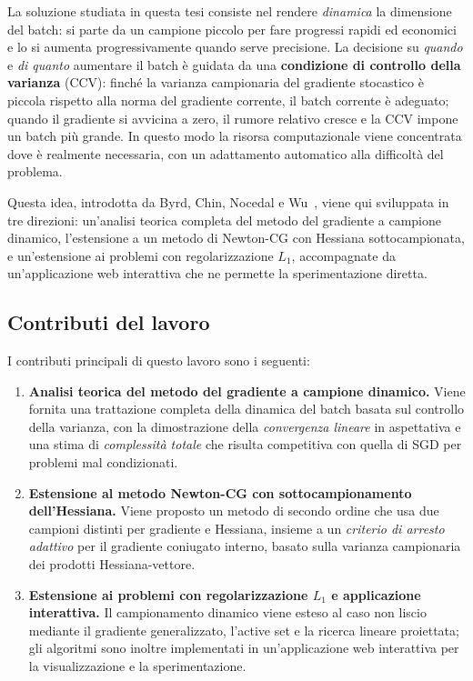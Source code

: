 \documentclass[a4paper,12pt]{article}
\numberwithin{equation}{section}
\numberwithin{figure}{section}
\numberwithin{table}{section}
\begin{document}
La soluzione studiata in questa tesi consiste nel rendere \emph{dinamica} la
dimensione del batch: si parte da un campione piccolo per fare progressi rapidi
ed economici e lo si aumenta progressivamente quando serve precisione. La
decisione su \emph{quando} e \emph{di quanto} aumentare il batch è guidata da
una \textbf{condizione di controllo della varianza} (CCV): finché la varianza
campionaria del gradiente stocastico è piccola rispetto alla norma del
gradiente corrente, il batch corrente è adeguato; quando il gradiente si
avvicina a zero, il rumore relativo cresce e la CCV impone un batch più grande.
In questo modo la risorsa computazionale viene concentrata dove è realmente
necessaria, con un adattamento automatico alla difficoltà del problema.

Questa idea, introdotta da Byrd, Chin, Nocedal e Wu~\cite{byrd2012}, viene
qui sviluppata in tre direzioni: un'analisi teorica completa del metodo del
gradiente a campione dinamico, l'estensione a un metodo di Newton-CG con
Hessiana sottocampionata, e un'estensione ai problemi con regolarizzazione
$L_1$, accompagnate da un'applicazione web interattiva che ne permette la
sperimentazione diretta.

\subsection{Contributi del lavoro}

I contributi principali di questo lavoro sono i seguenti:

\begin{enumerate}
  \item \textbf{Analisi teorica del metodo del gradiente a campione dinamico.}
  Viene fornita una trattazione completa della dinamica del batch basata sul
  controllo della varianza, con la dimostrazione della \emph{convergenza
  lineare} in aspettativa e una stima di \emph{complessità totale} che risulta
  competitiva con quella di SGD per problemi mal condizionati.
  \item \textbf{Estensione al metodo Newton-CG con sottocampionamento
  dell'Hessiana.} Viene proposto un metodo di secondo ordine che usa due
  campioni distinti per gradiente e Hessiana, insieme a un \emph{criterio di
  arresto adattivo} per il gradiente coniugato interno, basato sulla varianza
  campionaria dei prodotti Hessiana-vettore.
  \item \textbf{Estensione ai problemi con regolarizzazione $L_1$ e
  applicazione interattiva.} Il campionamento dinamico viene esteso al caso
  non liscio mediante il gradiente generalizzato, l'active set e la ricerca
  lineare proiettata; gli algoritmi sono inoltre implementati in un'applicazione
  web interattiva per la visualizzazione e la sperimentazione.
\end{enumerate}
\end{document}
